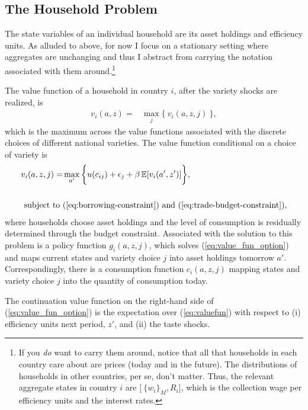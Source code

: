 \documentclass[12pt,pdftex]{article}
\begin{document}
\begin{onehalfspacing}
\subsection{The Household Problem}

The state variables of an individual household are its asset holdings and efficiency units. As alluded to above, for now I focus on a stationary setting where aggregates are unchanging and thus I abstract from carrying the notation associated with them around.\footnote{If you \emph{do} want to carry them around, notice that all that households in each country care about are prices (today and in the future). The distributions of households in other countries, per se, don't matter. Thus, the relevant aggregate states in country $i$ are $\big [ \ \{ w_i \}_{M}, R_i \big ]$, which is the collection wage per efficiency units and the interest rates.}

The value function of a household in country $i$, after the variety shocks are realized, is
\begin{align}
v_{i}(a, z) = &  \max_{j} \big  \{ \  v_{i}(a, z, j)  \ \big \},
\label{eq:valuefun}
\end{align}
which is the maximum across the value functions associated with the discrete choices of different national varieties. The value function conditional on a choice of variety is
\begin{align}
v_{i}(a, z, j) = &  \max_{\ a' \ }\bigg  \{ u(c_{ij}) + \epsilon_{j}  + \beta \, \mathbb{E} [v_{i}(a', z')]  \bigg\},
\label{eq:value_fun_option} \\
\nonumber \\
\mbox{subject to}  \ & (\ref{eq:borrowing-constraint}) \  \mathrm{and} \ (\ref{eq:trade-budget-constraint}), \nonumber
\end{align}
where households choose asset holdings and the level of consumption is residually determined through the budget constraint. Associated with the solution to this problem is a policy function $g_{i}(a,z, j)$, which solves (\ref{eq:value_fun_option}) and maps current states and variety choice $j$ into asset holdings tomorrow $a'$. Correspondingly, there is a consumption function $c_{i}(a,z, j)$ mapping states and variety choice $j$ into the quantity of consumption today.

The continuation value function on the right-hand side of (\ref{eq:value_fun_option}) is the expectation over (\ref{eq:valuefun}) with respect to (i) efficiency units next period, $z'$, and (ii) the taste shocks.


\end{onehalfspacing}
\end{document}

